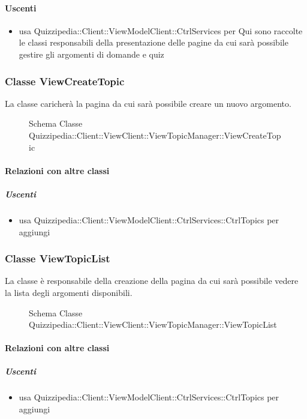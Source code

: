 \paragraph{Uscenti}
\begin{itemize}
\item usa Quizzipedia::Client::ViewModelClient::CtrlServices per Qui sono raccolte le classi responsabili della presentazione delle pagine da cui sarà possibile gestire gli argomenti di domande e quiz
\end{itemize}
\subsubsection{Classe ViewCreateTopic}
La classe caricherà la pagina da cui sarà possibile creare un nuovo argomento.
\begin{figure}[H]
\centering
\noindent{}
\caption[Schema Classe ViewCreateTopic]{Schema Classe Quizzipedia::Client::ViewClient::ViewTopicManager::ViewCreateTopic}
\end{figure}
\paragraph{Relazioni con altre classi}
\subparagraph{Uscenti}
\begin{itemize}
\item usa Quizzipedia::Client::ViewModelClient::CtrlServices::CtrlTopics per aggiungi
\end{itemize}
\subsubsection{Classe ViewTopicList}
La classe è responsabile della creazione della pagina da cui sarà possibile vedere la lista degli argomenti disponibili.
\begin{figure}[H]
\centering
\noindent{}
\caption[Schema Classe ViewTopicList]{Schema Classe Quizzipedia::Client::ViewClient::ViewTopicManager::ViewTopicList}
\end{figure}
\paragraph{Relazioni con altre classi}
\subparagraph{Uscenti}
\begin{itemize}
\item usa Quizzipedia::Client::ViewModelClient::CtrlServices::CtrlTopics per aggiungi
\end{itemize}
